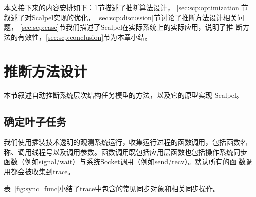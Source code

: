 本文接下来的内容安排如下：\ref{sec:scp:design}节描述了推断算法设计，
\ref{sec:scp:optimization}节叙述了对Scalpel实现的优化，
\ref{sec:scp:discussion}节讨论了推断方法设计相关问题，
\ref{sec:scp:case}节我们描述了Scalpel在实际系统上的实际应用，说明了推
断方法的有效性，\ref{sec:scp:conclusion}节为本章小结。

\section{推断方法设计}
\label{sec:scp:design}

本节叙述自动推断系统层次结构任务模型的方法，以及它的原型实现
\pozhehao{}Scalpel。



\subsection{确定叶子任务}

我们使用插装技术透明的观测系统运行，收集运行过程的函数调用，包括函数名
称、调用线程号以及调用参数。函数调用既包括应用层函数也包括操作系统同步
函数（例如signal/wait）与系统Socket调用（例如send/recv）。默认所有的函
数调用都会被收集到trace。

表~\ref{fig:sync_func}小结了trace中包含的常见同步对象和相关同步操作。

